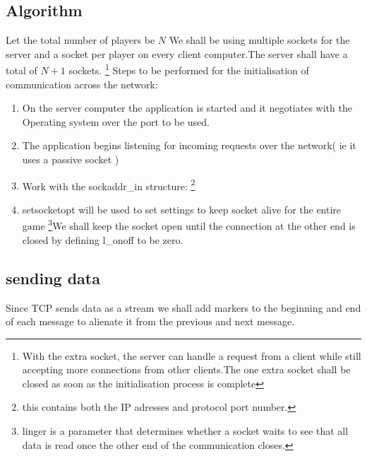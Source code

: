 \subsection{Algorithm}
Let the total number of players be $N$
We shall be using multiple sockets for the server and a socket per player on every client computer.The server shall have a total  of $N+1$ sockets.
\footnote{With the extra socket, the server can handle a request from a client while still accepting more connections from other clients.The one extra socket shall be closed as soon as the initialisation process is complete}
Steps to be performed for the initialisation of communication across the network:
\begin{enumerate}
 \item On the server computer the application is started and it negotiates with the Operating system over the port to be used.
\item The application begins listening for incoming requests over the network( ie it uses a passive socket )
 \item Work with the sockaddr\_in structure:
\footnote{this contains both the IP adresses and protocol port number.}
\item setsocketopt will be used to set settings to keep socket alive for the entire game \footnote{linger is a parameter that determines whether a socket waits to see that all data
is read once the other end of the communication closes.
}We shall keep the socket open until the connection at the other end is closed by defining l\_onoff to be zero.
 \end{enumerate}
 \subsection{sending data}
Since TCP sends data as a stream we shall add markers to the beginning and end of each message to alienate it from the previous and next message.

\pagebreak 
